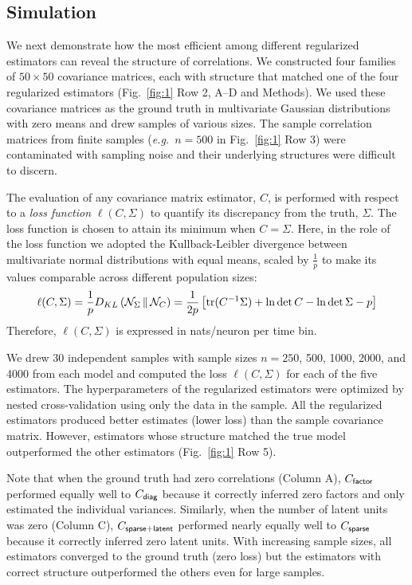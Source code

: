 \subsection{Simulation}
We next demonstrate how the most efficient among different regularized estimators can reveal the structure of correlations.
We constructed four families of $50\times 50$ covariance matrices, each with structure that matched one of the four regularized estimators (Fig.~\ref{fig:1} Row 2, A--D and Methods).  We used these covariance matrices as the ground truth in multivariate Gaussian distributions with zero means and drew samples of various sizes. 
The sample correlation matrices from finite samples (\emph{e.g.}\ $n=500$ in Fig.~\ref{fig:1} Row 3) were contaminated with sampling noise and their underlying structures were difficult to discern.

The evaluation of any covariance matrix estimator, $C$, is performed with respect to a \emph{loss function} $\ell(C,\Sigma)$ to quantify its discrepancy from the truth, $\Sigma$.  The loss function is chosen to attain its minimum when $C=\Sigma$.
Here, in the role of the loss function we adopted the Kullback-Leibler divergence between multivariate normal distributions with equal means, scaled by $\frac 1 p$ to make its values comparable across different population sizes: 
\begin{equation}\label{eq:loss}
    \ell(C,\Sigma) = 
    \frac 1 p D_{KL}\left(\mathcal N_\Sigma\,\Vert\,\mathcal N_C\right) = 
    \frac 1 {2p} \left[\operatorname{tr}(C^{-1}\Sigma) + \ln\det C - \ln\det\Sigma - p\right] 
\end{equation}
Therefore, $\ell(C,\Sigma)$ is expressed in nats/neuron per time bin.

We drew 30 independent samples with sample sizes $n=250$, 500, 1000, 2000, and 4000 from each model and computed the loss $\ell(C,\Sigma)$ for each of the five estimators.  
The hyperparameters of the regularized estimators were optimized by nested cross-validation using only the data in the sample.  
All the regularized estimators produced better estimates (lower loss) than the sample covariance matrix.  
However, estimators whose structure matched the true model outperformed the other estimators (Fig.~\ref{fig:1} Row 5).

Note that when the ground truth had zero correlations (Column A), $C_{\sf factor}$ performed equally well to $C_{\sf diag}$ because it correctly inferred zero factors and only estimated the individual variances. 
Similarly, when the number of latent units was zero (Column C), $C_{\sf sparse+latent}$ performed nearly equally well to $C_{\sf sparse}$ because it correctly inferred zero latent units.
With increasing sample sizes, all estimators converged to the ground truth (zero loss) but the estimators with correct structure outperformed the others even for large samples.

